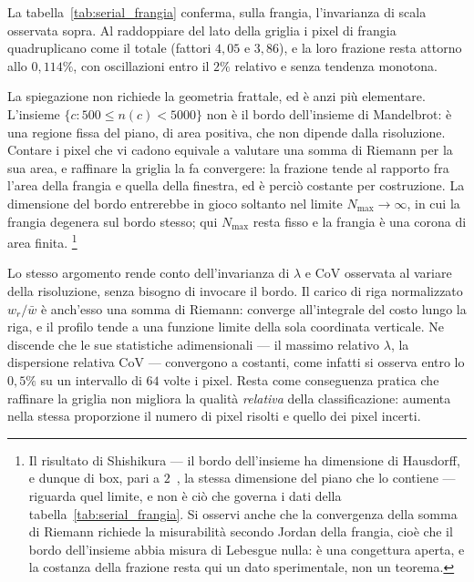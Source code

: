 \vspace{5mm}

La tabella~\ref{tab:serial_frangia} conferma, sulla frangia, l'invarianza di
scala osservata sopra. Al raddoppiare del lato della griglia i pixel di frangia
quadruplicano come il totale (fattori $4{,}05$ e $3{,}86$), e la loro frazione
resta attorno allo $0{,}114\%$, con oscillazioni entro il $2\%$ relativo e senza
tendenza monotona.

La spiegazione non richiede la geometria frattale, ed è anzi più elementare.
L'insieme $\{c : 500 \le n(c) < 5000\}$ non è il bordo dell'insieme di
Mandelbrot: è una regione fissa del piano, di area positiva, che non dipende
dalla risoluzione. Contare i pixel che vi cadono equivale a valutare una somma
di Riemann per la sua area, e raffinare la griglia la fa convergere: la frazione
tende al rapporto fra l'area della frangia e quella della finestra, ed è perciò
costante per costruzione. La dimensione del bordo entrerebbe in gioco soltanto
nel limite $N_{\max} \to \infty$, in cui la frangia degenera sul bordo stesso;
qui $N_{\max}$ resta fisso e la frangia è una corona di area finita.%
\footnote{Il risultato di Shishikura --- il bordo dell'insieme ha dimensione di
Hausdorff, e dunque di box, pari a $2$~\cite{shishikura1998}, la stessa
dimensione del piano che lo contiene --- riguarda quel limite, e non è ciò che
governa i dati della tabella~\ref{tab:serial_frangia}. Si osservi anche che la
convergenza della somma di Riemann richiede la misurabilità secondo Jordan della
frangia, cioè che il bordo dell'insieme abbia misura di Lebesgue nulla: è una
congettura aperta, e la costanza della frazione resta qui un dato sperimentale,
non un teorema.}

Lo stesso argomento rende conto dell'invarianza di $\lambda$ e $\mathrm{CoV}$
osservata al variare della risoluzione, senza bisogno di invocare il bordo. Il
carico di riga normalizzato $w_r/\bar w$ è anch'esso una somma di Riemann:
converge all'integrale del costo lungo la riga, e il profilo tende a una
funzione limite della sola coordinata verticale. Ne discende che le sue
statistiche adimensionali --- il massimo relativo $\lambda$, la dispersione
relativa $\mathrm{CoV}$ --- convergono a costanti, come infatti si osserva entro
lo $0{,}5\%$ su un intervallo di $64$ volte i pixel. Resta come conseguenza
pratica che raffinare la griglia non migliora la qualità \emph{relativa} della
classificazione: aumenta nella stessa proporzione il numero di pixel risolti e
quello dei pixel incerti.

